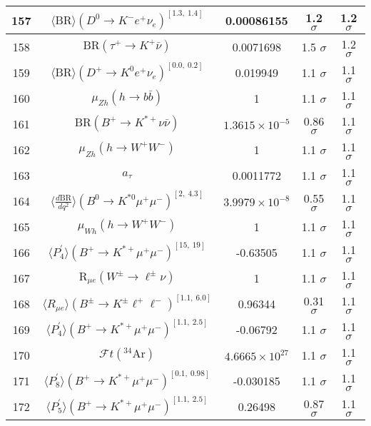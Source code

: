 \begin{longtable}{|c|c|c|c|c|}
157 &	 $\langle\mathrm{BR}\rangle(D^0\to K^- e^+\nu_e)^{[1.3,\  1.4]}$ &	 0.00086155 &	 \cellcolor{green!0}1.2 $ \sigma$ &	 1.2 $ \sigma$ \\ \hline
158 &	 $\mathrm{BR}(\tau^+\to K^+\bar\nu)$ &	 0.0071698 &	 \cellcolor{red!16}1.5 $ \sigma$ &	 1.2 $ \sigma$ \\ \hline
159 &	 $\langle\mathrm{BR}\rangle(D^+\to K^0e^+\nu_e)^{[0.0,\  0.2]}$ &	 0.019949 &	 \cellcolor{red!0}1.1 $ \sigma$ &	 1.1 $ \sigma$ \\ \hline
160 &	 $\mu_{Zh}(h \to b\bar b)$ &	 1 &	 \cellcolor{red!0}1.1 $ \sigma$ &	 1.1 $ \sigma$ \\ \hline
161 &	 $\mathrm{BR}(B^+\to K^{*+}\nu\bar\nu)$ &	 $1.3615\times 10^{-5}$ &	 \cellcolor{green!14}0.86 $ \sigma$ &	 1.1 $ \sigma$ \\ \hline
162 &	 $\mu_{Zh}(h \to W^+W^-)$ &	 1 &	 \cellcolor{green!0}1.1 $ \sigma$ &	 1.1 $ \sigma$ \\ \hline
163 &	 $a_\tau$ &	 0.0011772 &	 1.1 $ \sigma$ &	 1.1 $ \sigma$ \\ \hline
164 &	 $\langle \frac{d\mathrm{BR}}{dq^2} \rangle(B^0\to K^{\ast 0}\mu^+\mu^-)^{[2,\  4.3]}$ &	 $3.9979\times 10^{-8}$ &	 \cellcolor{green!28}0.55 $ \sigma$ &	 1.1 $ \sigma$ \\ \hline
165 &	 $\mu_{Wh}(h \to W^+W^-)$ &	 1 &	 \cellcolor{green!0}1.1 $ \sigma$ &	 1.1 $ \sigma$ \\ \hline
166 &	 $\langle P_4^\prime\rangle(B^+\to K^{\ast +}\mu^+\mu^-)^{[15,\  19]}$ &	 -0.63505 &	 \cellcolor{green!0}1.1 $ \sigma$ &	 1.1 $ \sigma$ \\ \hline
167 &	 $\mathrm{R}_{\mu  e}(W^\pm\to \ell^\pm\nu)$ &	 1 &	 \cellcolor{red!0}1.1 $ \sigma$ &	 1.1 $ \sigma$ \\ \hline
168 &	 $\langle R_{\mu e} \rangle(B^\pm\to K^\pm \ell^+\ell^-)^{[1.1,\  6.0]}$ &	 0.96344 &	 \cellcolor{green!39}0.31 $ \sigma$ &	 1.1 $ \sigma$ \\ \hline
169 &	 $\langle P_4^\prime\rangle(B^+\to K^{\ast +}\mu^+\mu^-)^{[1.1,\  2.5]}$ &	 -0.06792 &	 \cellcolor{red!0}1.1 $ \sigma$ &	 1.1 $ \sigma$ \\ \hline
170 &	 $\mathcal{F}t({}^{34}\mathrm{Ar})$ &	 $4.6665\times 10^{27}$ &	 \cellcolor{red!0}1.1 $ \sigma$ &	 1.1 $ \sigma$ \\ \hline
171 &	 $\langle P_8^\prime\rangle(B^+\to K^{\ast +}\mu^+\mu^-)^{[0.1,\  0.98]}$ &	 -0.030185 &	 \cellcolor{green!0}1.1 $ \sigma$ &	 1.1 $ \sigma$ \\ \hline
172 &	 $\langle P_5^\prime\rangle(B^+\to K^{\ast +}\mu^+\mu^-)^{[1.1,\  2.5]}$ &	 0.26498 &	 \cellcolor{green!10}0.87 $ \sigma$ &	 1.1 $ \sigma$ \\ \hline

\end{longtable}
